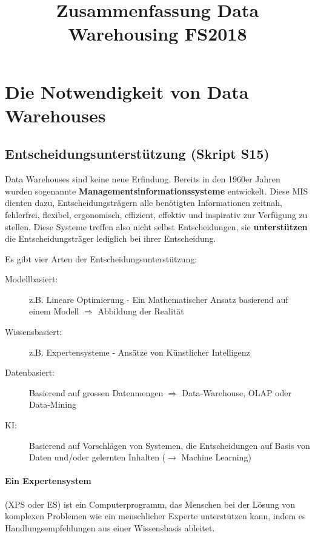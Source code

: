 \documentclass[a4paper, 11pt, nofootinbib]{article}
\begin{document}
\title{Zusammenfassung Data Warehousing FS2018}
\maketitle

\tableofcontents
\newpage
\listoffigures
\newpage

\graphicspath{{./Pictures/}}

\section{Die Notwendigkeit von Data Warehouses}
\subsection{Entscheidungsunterstützung (Skript S15)}
Data Warehouses sind keine neue Erfindung. Bereits in den 1960er Jahren wurden sogenannte \textbf{Managementsinformationssysteme} entwickelt. Diese MIS dienten dazu, Entscheidungsträgern alle benötigten Informationen zeitnah, fehlerfrei, flexibel, ergonomisch, effizient, effektiv und inspirativ zur Verfügung zu stellen. Diese Systeme treffen also nicht selbst Entscheidungen, sie \textbf{unterstützen} die Entscheidungsträger lediglich bei ihrer Entscheidung.

Es gibt vier Arten der Entscheidungsunterstützung:

\begin{description}
	\item [Modellbasiert:] z.B. Lineare Optimierung - Ein Mathematischer Ansatz basierend auf einem Modell $\Longrightarrow$ Abbildung der Realität
	\item [Wissensbasiert: ] z.B. Expertensysteme - Ansätze von Künstlicher Intelligenz
	\item [Datenbasiert: ] Basierend auf grossen Datenmengen $\Longrightarrow$ Data-Warehouse, OLAP oder Data-Mining
	\item [KI: ] Basierend auf Vorschlägen von Systemen, die Entscheidungen auf Basis von Daten und/oder gelernten Inhalten ($\longrightarrow$ Machine Learning)
\end{description}


\paragraph{Ein Expertensystem}(XPS oder ES) ist ein Computerprogramm, das Menschen bei der Lösung von komplexen Problemen wie ein menschlicher Experte unterstützen kann, indem es Handlungsempfehlungen aus einer Wissensbasis ableitet.
\end{document}
